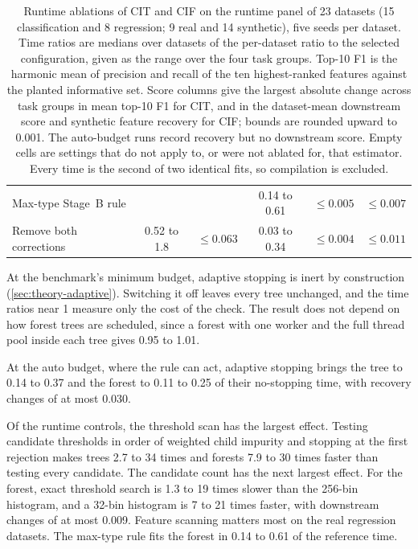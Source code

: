 \begin{table}[!htbp]
\begin{tabular}{@{}lccccc@{}}
    Max-type Stage~B rule & & & 0.14 to 0.61 & $\le 0.005$ & $\le 0.007$ \\
    Remove both corrections & 0.52 to 1.8 & $\le 0.063$ & 0.03 to 0.34 & $\le 0.004$ & $\le 0.011$ \\
    \bottomrule
  \end{tabular}
  \caption{Runtime ablations of CIT and CIF on the runtime panel of 23 datasets
  (15 classification and 8 regression; 9 real and 14 synthetic), five seeds per
  dataset. Time ratios are medians over datasets of the per-dataset ratio to
  the selected configuration, given as the range over the four task groups.
  Top-10 F1 is the harmonic mean of precision and recall of the ten
  highest-ranked features against the planted informative set. Score columns
  give the largest absolute change across task groups in mean top-10 F1 for
  CIT, and in the dataset-mean downstream score and synthetic feature recovery
  for CIF; bounds are rounded upward to 0.001. The auto-budget runs record
  recovery but no downstream score. Empty cells are settings that do not apply
  to, or were not ablated for, that estimator. Every time is the second of two
  identical fits, so compilation is excluded.}
  \label{tab:runtime-ablations}
\end{table}

At the benchmark's minimum budget, adaptive stopping is inert by construction
(\cref{sec:theory-adaptive}). Switching it off leaves every tree unchanged, and
the time ratios near 1 measure only the cost of the check. The result does not
depend on how forest trees are scheduled, since a forest with one worker and
the full thread pool inside each tree gives 0.95 to 1.01.

At the auto budget, where the rule can act, adaptive stopping brings the tree
to 0.14 to 0.37 and the forest to 0.11 to 0.25 of their no-stopping time, with
recovery changes of at most 0.030.

Of the runtime controls, the threshold scan has the largest effect. Testing
candidate thresholds in order of weighted child impurity and stopping at the
first rejection makes trees 2.7 to 34 times and forests 7.9 to 30 times faster
than testing every candidate. The candidate count has the next largest effect.
For the forest, exact threshold search is 1.3 to 19 times slower than the
256-bin histogram, and a 32-bin histogram is 7 to 21 times faster, with
downstream changes of at most 0.009. Feature scanning matters most on the real regression datasets. The
max-type rule fits the forest in 0.14 to 0.61 of the reference time.

